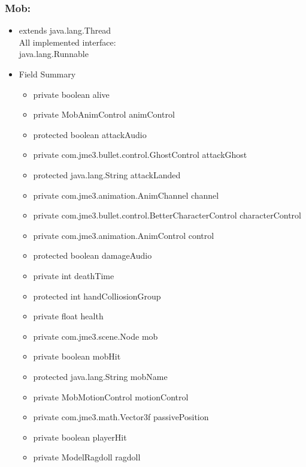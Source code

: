 \documentclass[letterpaper]{article}
\begin{document}
								\subsubsection*{Mob:}
								\vspace{0.1in}
									\begin{itemize}
										\item 	extends java.lang.Thread\\
												All implemented interface: \\
												java.lang.Runnable \\	
										\item	Field Summary
												\begin{itemize}
													\item	private boolean	alive 
													\item	private MobAnimControl	animControl 
													\item	protected boolean	attackAudio 
													\item	private com.jme3.bullet.control.GhostControl	attackGhost 
													\item	protected java.lang.String	attackLanded 
													\item	private com.jme3.animation.AnimChannel	channel 
													\item	private com.jme3.bullet.control.BetterCharacterControl	characterControl 
													\item	private com.jme3.animation.AnimControl	control 
													\item	protected boolean	damageAudio 
													\item	private int	deathTime 
													\item	protected int	handColliosionGroup 
													\item	private float	health 
													\item	private com.jme3.scene.Node	mob 
													\item	private boolean	mobHit 
													\item	protected java.lang.String	mobName 
													\item	private MobMotionControl	motionControl 
													\item	private com.jme3.math.Vector3f	passivePosition 
													\item	private boolean	playerHit 
													\item	private ModelRagdoll	ragdoll 

\end{itemize}
\end{itemize}
\end{document}
